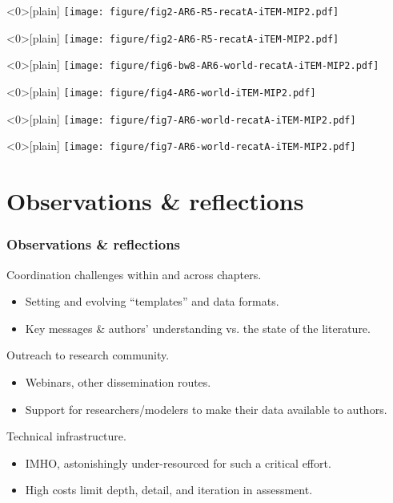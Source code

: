 \documentclass[12pt,aspectratio=169]{beamer}
\begin{document}
\begin{frame}<0>[plain]
  \centering
  \texttt{[image: figure/fig2-AR6-R5-recatA-iTEM-MIP2.pdf]}
\end{frame}

\begin{frame}<0>[plain]
  \centering
  \texttt{[image: figure/fig2-AR6-R5-recatA-iTEM-MIP2.pdf]}
\end{frame}

\begin{frame}<0>[plain]
  \centering
  \texttt{[image: figure/fig6-bw8-AR6-world-recatA-iTEM-MIP2.pdf]}
\end{frame}

\begin{frame}<0>[plain]
  \centering
  \texttt{[image: figure/fig4-AR6-world-iTEM-MIP2.pdf]}
\end{frame}

\begin{frame}<0>[plain]
  \centering
  \texttt{[image: figure/fig7-AR6-world-recatA-iTEM-MIP2.pdf]}
\end{frame}

\begin{frame}<0>[plain]
  \centering
  \texttt{[image: figure/fig7-AR6-world-recatA-iTEM-MIP2.pdf]}
\end{frame}

\section{Observations \& reflections}

\begin{frame}
\frametitle{Observations \& reflections}

Coordination challenges within and across chapters.
\begin{itemize}
  \item Setting and evolving “templates” and data formats.
  \item Key messages \& authors' understanding vs. the state of the literature.
\end{itemize}

\bigskip
Outreach to research community.
\begin{itemize}
  \item Webinars, other dissemination routes.
  \item Support for researchers/modelers to make their data available to authors.
\end{itemize}

\bigskip
Technical infrastructure.
\begin{itemize}
  \item IMHO, astonishingly under-resourced for such a critical effort.
  \item High costs limit depth, detail, and iteration in assessment.
\end{itemize}
\end{frame}
\end{document}
